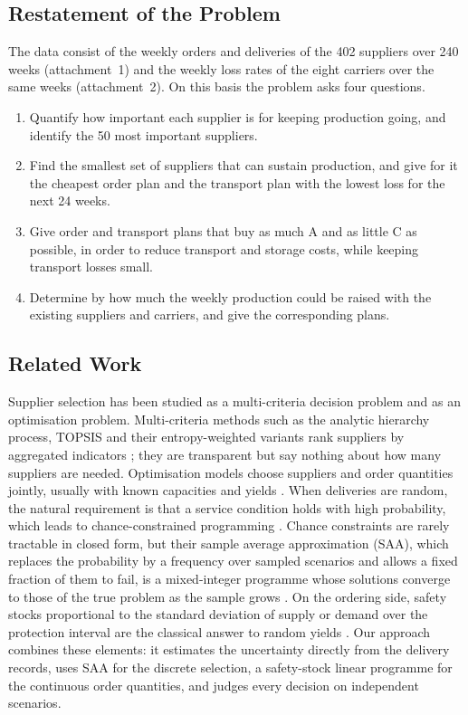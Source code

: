 \documentclass[11pt,a4paper]{article}
\begin{document}
\subsection{Restatement of the Problem}
The data consist of the weekly orders and deliveries of the 402 suppliers over 240 weeks (attachment~1) and the weekly loss rates of the eight carriers over the same weeks (attachment~2).
On this basis the problem asks four questions.
\begin{enumerate}[label=(\arabic*),itemsep=2pt]
\item Quantify how important each supplier is for keeping production going, and identify the 50 most important suppliers.
\item Find the smallest set of suppliers that can sustain production, and give for it the cheapest order plan and the transport plan with the lowest loss for the next 24 weeks.
\item Give order and transport plans that buy as much A and as little C as possible, in order to reduce transport and storage costs, while keeping transport losses small.
\item Determine by how much the weekly production could be raised with the existing suppliers and carriers, and give the corresponding plans.
\end{enumerate}

\subsection{Related Work}
Supplier selection has been studied as a multi-criteria decision problem and as an optimisation problem.
Multi-criteria methods such as the analytic hierarchy process, TOPSIS and their entropy-weighted variants rank suppliers by aggregated indicators \citep{ho2010,hwang1981}; they are transparent but say nothing about how many suppliers are needed.
Optimisation models choose suppliers and order quantities jointly, usually with known capacities and yields \citep{aissaoui2007}.
When deliveries are random, the natural requirement is that a service condition holds with high probability, which leads to chance-constrained programming \citep{charnes1959}.
Chance constraints are rarely tractable in closed form, but their sample average approximation (SAA), which replaces the probability by a frequency over sampled scenarios and allows a fixed fraction of them to fail, is a mixed-integer programme whose solutions converge to those of the true problem as the sample grows \citep{luedtke2008,pagnoncelli2009}.
On the ordering side, safety stocks proportional to the standard deviation of supply or demand over the protection interval are the classical answer to random yields \citep{silver2016}.
Our approach combines these elements: it estimates the uncertainty directly from the delivery records, uses SAA for the discrete selection, a safety-stock linear programme for the continuous order quantities, and judges every decision on independent scenarios.
\end{document}
